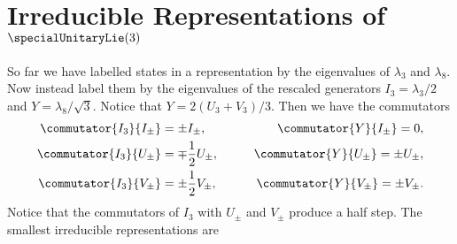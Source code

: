 \documentclass[fleqn]{NotesClass}
\begin{document}
    \section{Irreducible Representations of \texorpdfstring{\(\specialUnitaryLie(3)\)}{su(3)}}
    So far we have labelled states in a representation by the eigenvalues of \(\lambda_3\) and \(\lambda_8\).
    Now instead label them by the eigenvalues of the rescaled generators \(I_3 = \lambda_3/2\) and \(Y = \lambda_8/\sqrt{3}\).
    Notice that \(Y = 2(U_3 + V_3)/3\).
    Then we have the commutators
    \begin{alignat}{2}
        \commutator{I_3}{I_{\pm}} &= \pm I_{\pm}, \qquad & \commutator{Y}{I_{\pm}} = 0,\\
        \commutator{I_3}{U_{\pm}} &= \mp \frac{1}{2} U_{\pm}, \qquad & \commutator{Y}{U_{\pm}} = \pm U_{\pm},\\
        \commutator{I_3}{V_{\pm}} &= \pm \frac{1}{2} V_{\pm}, \qquad & \commutator{Y}{V_{\pm}} = \pm V_{\pm}.\\
    \end{alignat}
    Notice that the commutators of \(I_3\) with \(U_{\pm}\) and \(V_{\pm}\) produce a half step.
    The smallest irreducible representations are
\end{document}
